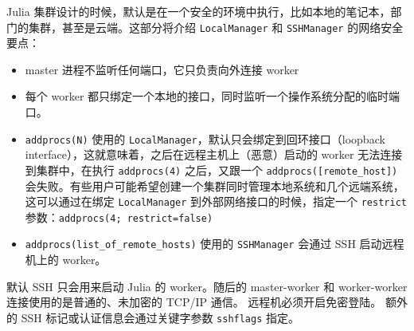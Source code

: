 Julia 集群设计的时候，默认是在一个安全的环境中执行，比如本地的笔记本，部门的集群，甚至是云端。这部分将介绍 \texttt{LocalManager} 和 \texttt{SSHManager} 的网络安全要点：



\begin{itemize}
\item master 进程不监听任何端口，它只负责向外连接 worker


\item 每个 worker 都只绑定一个本地的接口，同时监听一个操作系统分配的临时端口。


\item \texttt{addprocs(N)} 使用的 \texttt{LocalManager}，默认只会绑定到回环接口（loopback interface），这就意味着，之后在远程主机上（恶意）启动的 worker 无法连接到集群中，在执行 \texttt{addprocs(4)} 之后，又跟一个 \texttt{addprocs([{\textquotedbl}remote\_host{\textquotedbl}])} 会失败。有些用户可能希望创建一个集群同时管理本地系统和几个远端系统，这可以通过在绑定 \texttt{LocalManager} 到外部网络接口的时候，指定一个 \texttt{restrict} 参数：\texttt{addprocs(4; restrict=false)}


\item \texttt{addprocs(list\_of\_remote\_hosts)} 使用的 \texttt{SSHManager} 会通过 SSH 启动远程机上的 worker。

\end{itemize}


默认 SSH 只会用来启动 Julia 的 worker。随后的 master-worker 和 worker-worker 连接使用的是普通的、未加密的 TCP/IP 通信。     远程机必须开启免密登陆。     额外的 SSH 标记或认证信息会通过关键字参数 \texttt{sshflags} 指定。



